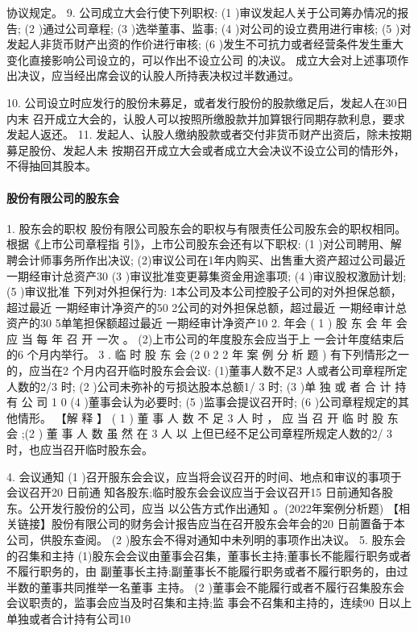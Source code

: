 \documentclass[UTF8,12pt]{ctexart}
\numberwithin{equation}{section} %
\numberwithin{figure}{section}
\numberwithin{table}{section}
\begin{document}
	协议规定。
	9. 公司成立大会行使下列职权:
	(1 )审议发起人关于公司筹办情况的报告;
	(2 )通过公司章程;
	(3 )选举董事、监事;
	(4 )对公司的设立费用进行审核;
	(5 )对发起人非货币财产出资的作价进行审核;
	(6 )发生不可抗力或者经营条件发生重大变化直接影响公司设立的，可以作出不设立公司 的决议。
	成立大会对上述事项作出决议，应当经出席会议的认股人所持表决权过半数通过。
	
	10. 公司设立时应发行的股份未募足，或者发行股份的股款缴足后，发起人在30日内末 召开成立大会的，认股人可以按照所缴股款并加算银行同期存款利息，要求发起人返还。
	11. 发起人、认股人缴纳股款或者交付非货币财产出资后，除未按期募足股份、发起人未 按期召开成立大会或者成立大会决议不设立公司的情形外，不得抽回其股本。
	
	\paragraph{股份有限公司的股东会}
	1. 股东会的职权 股份有限公司股东会的职权与有限责任公司股东会的职权相同。根据《上市公司章程指 引》，上市公司股东会还有以下职权:
	(1 )对公司聘用、解聘会计师事务所作出决议; (2)审议公司在1年内购买、出售重大资产超过公司最近 一期经审计总资产30%
	(3 )审议批准变更募集资金用途事项;
	(4 )审议股权激励计划;
	(5 )审议批准 下列对外担保行为: 1本公司及本公司控股子公司的对外担保总额，超过最近 一期经审计净资产的50%
	2公司的对外担保总额，超过最近 一期经审计总资产的30%
	5单笔担保额超过最近 一期经审计净资产10%
	2. 年会
	( 1 ) 股 东 会 年 会 应 当 每 年 召 开 一次 。
	(2)上市公司的年度股东会应当于上 一会计年度结束后的6 个月内举行。
	3 . 临 时 股 东 会 (2 0 2 2 年 案 例 分 析 题 )
	有下列情形之一的，应当在2 个月内召开临时股东会会议:
	(1)董事人数不足3 人或者公司章程所定人数的2/3 时;
	(2 )公司未弥补的亏损达股本总额1/ 3 时;
	(3 )单 独 或 者 合 计 持 有 公 司 1 0 %
	(4 )董事会认为必要时;
	(5 )监事会提议召开时;
	(6 )公司章程规定的其他情形。
	【解 释 】 ( 1 ) 董 事 人 数 不 足 3 人 时 ， 应 当 召 开 临 时 股 东 会 ;(2 ) 董 事 人 数 虽 然 在 3 人 以 上但已经不足公司章程所规定人数的2/ 3 时，也应当召开临时股东会。
	
	4. 会议通知
	(1 )召开服东会会议，应当将会议召开的时间、地点和审议的事项于会议召开20 日前通 知各股东;临时股东会会议应当于会议召开15 日前通知各股东。公开发行股份的公司，应当 以公告方式作出通知 。(2022年案例分析题)
	【相关链接】股份有限公司的财务会计报告应当在召开股东会年会的20 日前置备于本 公司，供股东查阅。
	(2 )股东会不得对通知中未列明的事项作出决议。
	5. 股东会的召集和主持 (1)股东会会议由董事会召集，董事长主持;董事长不能履行职务或者不履行职务的，由 副董事长主持;副董事长不能履行职务或者不履行职务的，由过半数的董事共同推举一名董事 主持。
	(2 )董事会不能履行或者不履行召集股东会会议职责的，监事会应当及时召集和主持;监 事会不召集和主持的，连续90 日以上单独或者合计持有公司10%
	
\end{document}
